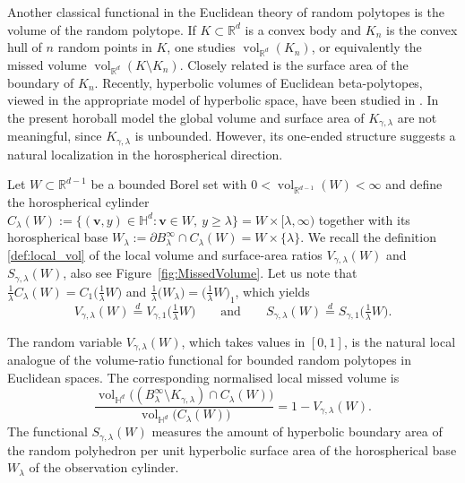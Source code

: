 \documentclass[11pt,a4paper]{article}
\theoremstyle{plain}
\theoremstyle{definition}
\theoremstyle{remark}
\newcommand{\vol}{\mathop{\mathrm{vol}}\nolimits}
\newcommand{\bv}{\boldsymbol{v}}
\def\HH{\mathbb{H}}
\def\RR{\mathbb{R}}
\begin{document}
Another classical functional in the Euclidean theory of random polytopes is
the volume of the random polytope. If $K\subset\RR^d$ is a convex body and
$K_n$ is the convex hull of $n$ random points in $K$, one studies
$\vol_{\RR^d}(K_n)$, or equivalently the missed volume
$\vol_{\RR^d}(K\setminus K_n)$. Closely related is the surface area of the boundary of $K_n$. Recently, hyperbolic volumes of Euclidean
beta-polytopes, viewed in the appropriate model of hyperbolic space,
have been studied in \cite{KS2026}.
In the present horoball model the global volume and surface area of
$K_{\gamma,\lambda}$ are not meaningful, since
$K_{\gamma,\lambda}$ is unbounded. However, its one-ended structure
suggests a natural localization in the horospherical direction.

Let $W\subset\RR^{d-1}$ be a bounded Borel set with
$0<\vol_{\RR^{d-1}}(W)<\infty$ and define the
horospherical cylinder $C_\lambda(W):= \{(\bv,y)\in\HH^d:\bv\in W,\ y\ge\lambda\}=W\times[\lambda,\infty)$
together with its horospherical base
$W_\lambda	:= \partial B_\lambda^\infty\cap C_\lambda(W) =W\times\{\lambda\}$.
We recall the definition \eqref{def:local_vol} of the local volume and surface-area ratios $V_{\gamma,\lambda}(W)$ and $S_{\gamma,\lambda}(W)$, also see Figure~\ref{fig:MissedVolume}. Let us note that
$\frac{1}{\lambda} C_{\lambda}(W) = C_{1}\bigl(\frac{1}{\lambda}W\bigr)$ and
$\frac{1}{\lambda} \bigl(W_{\lambda}\bigr) = \bigl(\frac{1}{\lambda}W\bigr)_{1}$,
which yields
\begin{equation*}
	V_{\gamma,\lambda}(W) \overset{d}{=} V_{\gamma,1}\bigl(\tfrac{1}{\lambda}W\bigr) \qquad \text{and}\qquad
	S_{\gamma,\lambda}(W) \overset{d}{=} S_{\gamma,1}\bigl(\tfrac{1}{\lambda}W\bigr).
\end{equation*}

The random variable $V_{\gamma,\lambda}(W)$, which takes values in
$[0,1]$, is the natural local analogue of the volume-ratio functional for
bounded random polytopes in Euclidean spaces. The corresponding normalised
local missed volume is
\[
	\frac{\vol_{\HH^d}\bigl(
		(B_\lambda^\infty\setminus K_{\gamma,\lambda})
		\cap C_\lambda(W)
		\bigr)}
	{\vol_{\HH^d}\bigl(C_\lambda(W)\bigr)}
	=
	1-V_{\gamma,\lambda}(W).
\]
The functional $S_{\gamma,\lambda}(W)$ measures the amount of
hyperbolic boundary area of the random polyhedron per unit hyperbolic
surface area of the horospherical base $W_\lambda$ of the observation
cylinder.
\end{document}
